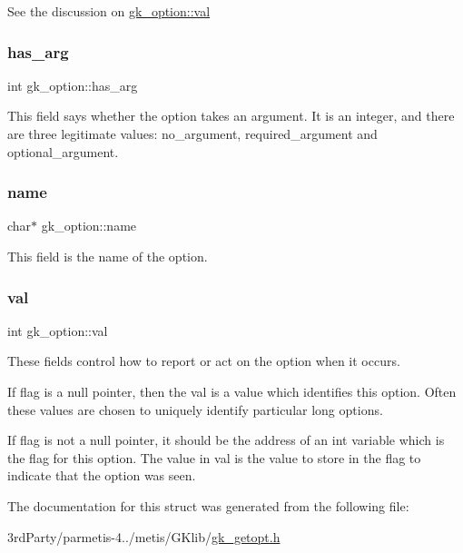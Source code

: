 See the discussion on \hyperlink{structgk__option_abf964c7489d269515ec8e5e62b2164ba}{gk\+\_\+option\+::val} \mbox{\label{structgk__option_a66d2ab88446836cef777d756098151f5}} 
\subsubsection{\texorpdfstring{has\+\_\+arg}{has\_arg}}
{\footnotesize\ttfamily int gk\+\_\+option\+::has\+\_\+arg}

This field says whether the option takes an argument. It is an integer, and there are three legitimate values\+: no\+\_\+argument, required\+\_\+argument and optional\+\_\+argument. \mbox{\label{structgk__option_aa47d0e4e90d3cd1793fc5344b1e99afc}} 
\subsubsection{\texorpdfstring{name}{name}}
{\footnotesize\ttfamily char$\ast$ gk\+\_\+option\+::name}

This field is the name of the option. \mbox{\label{structgk__option_abf964c7489d269515ec8e5e62b2164ba}} 
\subsubsection{\texorpdfstring{val}{val}}
{\footnotesize\ttfamily int gk\+\_\+option\+::val}

These fields control how to report or act on the option when it occurs.

If flag is a null pointer, then the val is a value which identifies this option. Often these values are chosen to uniquely identify particular long options.

If flag is not a null pointer, it should be the address of an int variable which is the flag for this option. The value in val is the value to store in the flag to indicate that the option was seen. 

The documentation for this struct was generated from the following file\+:\begin{DoxyCompactItemize}
\item 
3rd\+Party/parmetis-\/4../metis/\+G\+Klib/\hyperlink{gk__getopt_8h}{gk\+\_\+getopt.\+h}\end{DoxyCompactItemize}
